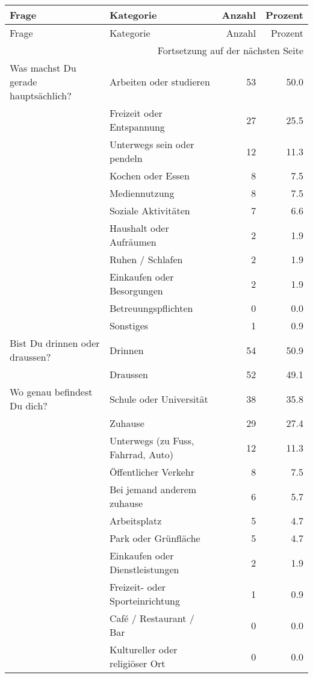 \begin{appendices}
\begin{longtable}{p{4cm}p{5cm}rr}
    \toprule
    Frage & Kategorie & Anzahl & Prozent \\
    \midrule
    \endfirsthead
    \toprule
    Frage & Kategorie & Anzahl & Prozent \\
    \midrule
    \endhead
    \midrule
    \multicolumn{4}{r}{Fortsetzung auf der nächsten Seite} \\
    \midrule
    \endfoot
    \bottomrule
    \endlastfoot
    Was machst Du gerade hauptsächlich? & Arbeiten oder studieren & 53 & 50.0 \\*
     & Freizeit oder Entspannung & 27 & 25.5 \\*
     & Unterwegs sein oder pendeln & 12 & 11.3 \\*
     & Kochen oder Essen & 8 & 7.5 \\*
     & Mediennutzung & 8 & 7.5 \\*
     & Soziale Aktivitäten & 7 & 6.6 \\*
     & Haushalt oder Aufräumen & 2 & 1.9 \\*
     & Ruhen / Schlafen & 2 & 1.9 \\*
     & Einkaufen oder Besorgungen & 2 & 1.9 \\*
     & Betreuungspflichten & 0 & 0.0 \\*
     & Sonstiges & 1 & 0.9 \\
    \midrule
    \addlinespace
    Bist Du drinnen oder draussen? & Drinnen & 54 & 50.9 \\*
     & Draussen & 52 & 49.1 \\
    \midrule
    \addlinespace
    Wo genau befindest Du dich? & Schule oder Universität & 38 & 35.8 \\*
     & Zuhause & 29 & 27.4 \\*
     & Unterwegs (zu Fuss, Fahrrad, Auto) & 12 & 11.3 \\*
     & Öffentlicher Verkehr & 8 & 7.5 \\*
     & Bei jemand anderem zuhause & 6 & 5.7 \\*
     & Arbeitsplatz & 5 & 4.7 \\*
     & Park oder Grünfläche & 5 & 4.7 \\*
     & Einkaufen oder Dienstleistungen & 2 & 1.9 \\*
     & Freizeit- oder Sporteinrichtung & 1 & 0.9 \\*
     & Café / Restaurant / Bar & 0 & 0.0 \\*
     & Kultureller oder religiöser Ort & 0 & 0.0 \\*

\end{longtable}
\end{appendices}
